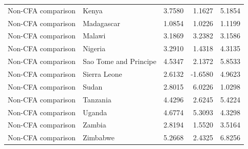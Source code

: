 \begin{table}
\begin{tabular}[t]{llrrr}
Non-CFA comparison & Kenya & 3.7580 & 1.1627 & 5.1854\\
\addlinespace
Non-CFA comparison & Madagascar & 1.0854 & 1.0226 & 1.1199\\
Non-CFA comparison & Malawi & 3.1869 & 3.2382 & 3.1586\\
Non-CFA comparison & Nigeria & 3.2910 & 1.4318 & 4.3135\\
Non-CFA comparison & Sao Tome and Principe & 4.5347 & 2.1372 & 5.8533\\
Non-CFA comparison & Sierra Leone & 2.6132 & -1.6580 & 4.9623\\
\addlinespace
Non-CFA comparison & Sudan & 2.8015 & 6.0226 & 1.0298\\
Non-CFA comparison & Tanzania & 4.4296 & 2.6245 & 5.4224\\
Non-CFA comparison & Uganda & 4.6774 & 5.3093 & 4.3298\\
Non-CFA comparison & Zambia & 2.8194 & 1.5520 & 3.5164\\
Non-CFA comparison & Zimbabwe & 5.2668 & 2.4325 & 6.8256\\
\bottomrule
\end{tabular}
\end{table}